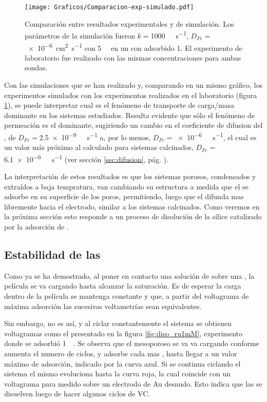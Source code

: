 		
				\begin{figure}[ht]
					\centering
			 	    \texttt{[image: Graficos/Comparacion-exp-simulado.pdf]}
			        \caption[Simulación EQ comparadas con datos experimentales]{Comparación entre resultados experimentales y de simulación. Los parámetros de la simulación fueron $k=$\SI{1000}{\per\Molar\per\second}, $D_{Fc}=$ \SI{e-6}{\square\cm\per\second} con \fc\space \SI{5}{\milli\Molar} en un \pdm\space con \ru\space adsorbido \SI{1}{\Molar}. El experimento de laboratorio fue realizado con las mismas concentraciones para ambas sondas.}
			        \label{fig:comp_sim_exp}
			      	\end{figure}
		

		Con las simulaciones que se han realizado y, comparando en un mismo gráfico, los experimentos simulados con los experimentos realizados en el laboratorio (figura \ref{fig:comp_sim_exp}), se puede interpretar cual es el fenómeno de transporte de carga/masa dominante en los sistemas estudiados. Resulta evidente que sólo el fenómeno de permeación es el dominante, sugiriendo un cambio en el coeficiente de difusion del \fc, de $D_{Fc}=$\SI{2.5e-9}{\per\Molar\per\second} a, por lo menos, $D_{Fc}\!=$\SI{e-6}{\per\Molar\per\second}, el cual es un valor más próximo al calculado para sistemas calcinados, $D_{Fc}=$\SI{6.1e-6}{\per\Molar\per\second} (ver sección \ref{sec:difusion}, pág. \pageref{sec:difusion}). 

		La interpretación de estos resultados es que los sistemas porosos, condensados y extraídos a baja tempratura, van cambiando su estructura a medida que el \ru\space se adsorbe en su superficie de los poros, permitiendo, luego que el \fc\space difunda mas libremente hacia el electrodo, similar a los sistemas calcinados. Como veremos en la próxima sección esto responde a un proceso de disolución de la sílice catalizado por la adsorción de \aminorutenio.

	\subsection{Estabilidad de las \pdmF}

		Como ya se ha demostrado, al poner en contacto una solución de \ru\space sobre una \pdmF, la película se va cargando hasta alcanzar la saturación. Es de esperar la carga dentro de la película se mantenga constante y que, a partir del voltagrama de máxima adsorción las sucesivas voltametrías sean equivalentes.

		Sin embargo, no es así, y al ciclar constantemente el sistema se obtienen voltagramas como el presentado en la figura \ref{fig:diso_ru1mM}, experimento donde se adsorbió \ru\space \SI{1}{\milli\Molar}. Se observa que el mesoporoso se va va cargando conforme aumenta el numero de ciclos, y adsorbe cada mas \ru, hasta llegar a un valor máximo de adsorción, indicado por la curva azul. Si se continua ciclando el sistema el mismo evoluciona hasta la curva roja, la cual coincide con un voltagrama para \ru\space medido sobre un electrodo de Au desnudo. Esto indica que las \pdmF\space se disuelven luego de hacer algunos ciclos de VC.

